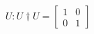 \documentclass[preview]{standalone}
\begin{document}
\begin{align*}
U: U\dagger U = \begin{bmatrix} 1 & 0 \\ 0 & 1 \end{bmatrix}
\end{align*}
\end{document}
